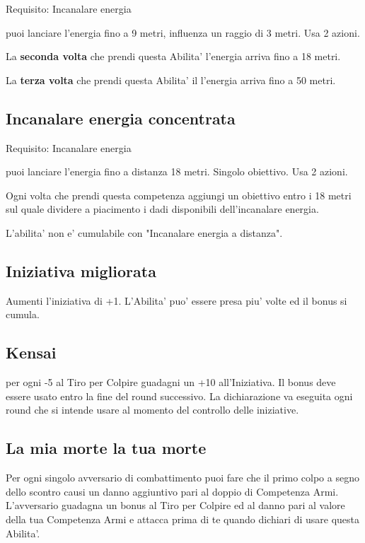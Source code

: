 \documentclass[a4paper,11pt,twoside,openany]{book}
\begin{document}
Requisito: Incanalare energia

puoi lanciare l'energia fino a 9 metri, influenza un raggio di 3 metri. Usa 2 azioni.

La \textbf{seconda volta} che prendi questa Abilita' l'energia arriva fino a 18 metri.

La \textbf{terza volta} che prendi questa Abilita' il l'energia arriva fino a 50 metri.

\subsection{Incanalare energia concentrata}

Requisito: Incanalare energia

puoi lanciare l'energia fino a distanza 18 metri. Singolo obiettivo. Usa 2 azioni.

Ogni volta che prendi questa competenza aggiungi un obiettivo entro i 18 metri sul quale dividere a piacimento i dadi disponibili dell'incanalare energia.

L'abilita' non e' cumulabile con "Incanalare energia a distanza".

\subsection{Iniziativa migliorata}

Aumenti l'iniziativa di +1. L'Abilita' puo' essere presa piu' volte ed il bonus si cumula.

\subsection{Kensai}

per ogni -5 al Tiro per Colpire guadagni un +10 all'Iniziativa. Il bonus deve essere usato entro la fine del round successivo. La dichiarazione va eseguita ogni round che si intende usare al momento del controllo delle iniziative.

\subsection{La mia morte la tua morte}

Per ogni singolo avversario di combattimento puoi fare che il primo colpo a segno dello scontro causi un danno aggiuntivo pari al doppio di Competenza Armi. L'avversario guadagna un bonus al Tiro per Colpire ed al danno pari al valore della tua Competenza Armi e attacca prima di te quando dichiari di usare questa Abilita'.
\end{document}
